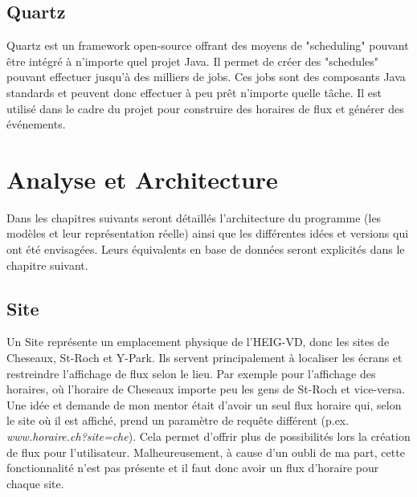 \documentclass[french]{article}
\begin{document}
\subsection{Quartz}
Quartz est un framework open-source offrant des moyens de "scheduling" pouvant être intégré à n'importe quel projet Java. Il permet de créer des "schedules" pouvant effectuer jusqu'à des milliers de jobs. Ces jobs sont des composants Java standards et peuvent donc effectuer à peu prêt n'importe quelle tâche. Il est utilisé dans le cadre du projet pour construire des horaires de flux et générer des événements.

\newpage
\section{Analyse et Architecture}

Dans les chapitres suivants seront détaillés l'architecture du programme (les modèles et leur représentation réelle) ainsi que les différentes idées et versions qui ont été envisagées. Leurs équivalents en base de données seront explicités dans le chapitre suivant.

\subsection{Site}
Un Site représente un emplacement physique de l'HEIG-VD, donc les sites de Cheseaux, St-Roch et Y-Park. Ils servent principalement à localiser les écrans et restreindre l'affichage de flux selon le lieu. Par exemple pour l'affichage des horaires, où l'horaire de Cheseaux importe peu les gens de St-Roch et vice-versa.\newline
 Une idée et demande de mon mentor était d'avoir un seul flux horaire qui, selon le site où il est affiché, prend un paramètre de requête différent (p.ex. \textit{www.horaire.ch?site=che}). Cela permet d'offrir plus de possibilités lors la création de flux pour l'utilisateur. Malheureusement, à cause d'un oubli de ma part, cette fonctionnalité n'est pas présente et il faut donc avoir un flux d'horaire pour chaque site.
 
\end{document}

